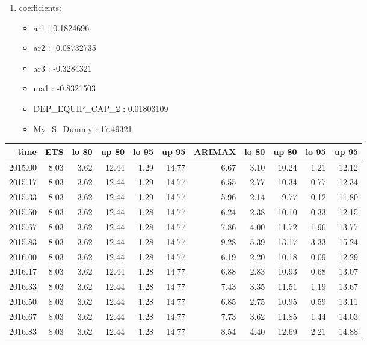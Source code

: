 \documentclass[10pt,a4paper]{article}\usepackage[]{graphicx}\usepackage[]{color}
\newcommand{\AaA}{\_}
\begin{document}
\begin{multicols}{2}
\begin{enumerate}
\item coefficients:
\begin{itemize}
\item  ar1 :  0.1824696 
\item  ar2 :  -0.08732735 
\item  ar3 :  -0.3284321 
\item  ma1 :  -0.8321503 
\item  DEP\AaA EQUIP\AaA CAP\AaA 2 :  0.01803109 
\item  My_S_Dummy :  17.49321 
\end{itemize}
\end{enumerate}
\end{multicols}
\begin{table}[ht]
\centering
\begin{tabular}{rrrrrrrrrrr}
  \hline
time & ETS  & lo 80 & up 80 & lo 95 & up 95 & ARIMAX  & lo 80 & up 80 & lo 95 & up 95 \\ 
  \hline
2015.00 & 8.03 & 3.62 & 12.44 & 1.29 & 14.77 & 6.67 & 3.10 & 10.24 & 1.21 & 12.12 \\ 
  2015.17 & 8.03 & 3.62 & 12.44 & 1.29 & 14.77 & 6.55 & 2.77 & 10.34 & 0.77 & 12.34 \\ 
  2015.33 & 8.03 & 3.62 & 12.44 & 1.29 & 14.77 & 5.96 & 2.14 & 9.77 & 0.12 & 11.80 \\ 
  2015.50 & 8.03 & 3.62 & 12.44 & 1.28 & 14.77 & 6.24 & 2.38 & 10.10 & 0.33 & 12.15 \\ 
  2015.67 & 8.03 & 3.62 & 12.44 & 1.28 & 14.77 & 7.86 & 4.00 & 11.72 & 1.96 & 13.77 \\ 
  2015.83 & 8.03 & 3.62 & 12.44 & 1.28 & 14.77 & 9.28 & 5.39 & 13.17 & 3.33 & 15.24 \\ 
  2016.00 & 8.03 & 3.62 & 12.44 & 1.28 & 14.77 & 6.19 & 2.20 & 10.18 & 0.09 & 12.29 \\ 
  2016.17 & 8.03 & 3.62 & 12.44 & 1.28 & 14.77 & 6.88 & 2.83 & 10.93 & 0.68 & 13.07 \\ 
  2016.33 & 8.03 & 3.62 & 12.44 & 1.28 & 14.77 & 7.43 & 3.35 & 11.51 & 1.19 & 13.67 \\ 
  2016.50 & 8.03 & 3.62 & 12.44 & 1.28 & 14.77 & 6.85 & 2.75 & 10.95 & 0.59 & 13.11 \\ 
  2016.67 & 8.03 & 3.62 & 12.44 & 1.28 & 14.77 & 7.73 & 3.62 & 11.85 & 1.44 & 14.03 \\ 
  2016.83 & 8.03 & 3.62 & 12.44 & 1.28 & 14.77 & 8.54 & 4.40 & 12.69 & 2.21 & 14.88 \\ 

\end{tabular}
\end{table}
\end{document}
